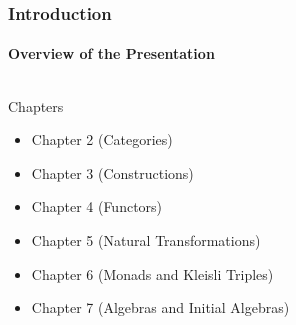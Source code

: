 \documentclass{beamer}
\begin{document}

\begin{frame}[label={overview-presentation}]
  \frametitle{Introduction}
  \framesubtitle{Overview of the Presentation}

  \begin{columns}[onlytextwidth,c]
    \begin{column}{.8\textwidth}
      \begin{block}{Chapters}
        \begin{itemize}
        \item \alert{Chapter 2 (Categories)}
        \item Chapter 3 (Constructions)
        \item \alert{Chapter 4 (Functors)}
        \item Chapter 5 (Natural Transformations)
        \item Chapter 6 (Monads and Kleisli Triples)
        \item Chapter 7 (Algebras and Initial Algebras)
        \end{itemize}
      \end{block}
    \end{column}
    \begin{column}{.2\textwidth}
      \begin{center}
      \end{center}
    \end{column}
  \end{columns}

\end{frame}

\end{document}
